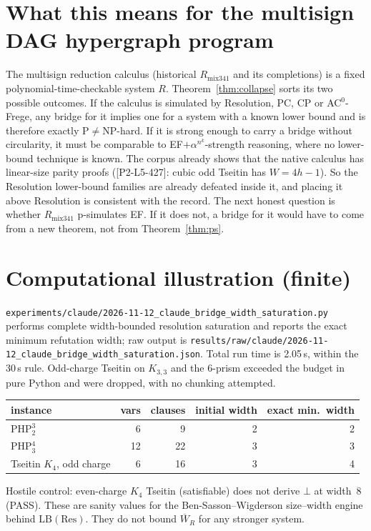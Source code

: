 \documentclass[11pt]{article}
\theoremstyle{definition}
\newcommand{\Wb}{\overline W}
\begin{document}
\section{What this means for the multisign DAG hypergraph program}
The multisign reduction calculus (historical $R_{\mathrm{mix341}}$ and its completions) is a fixed polynomial-time-checkable system $R$. Theorem~\ref{thm:collapse} sorts its two possible outcomes. If the calculus is simulated by Resolution, PC, CP or AC$^0$-Frege, any bridge for it implies one for a system with a known lower bound and is therefore exactly P$\ne$NP-hard. If it is strong enough to carry a bridge without circularity, it must be comparable to EF$+\alpha^{n^k}$-strength reasoning, where no lower-bound technique is known. The corpus already shows that the native calculus has linear-size parity proofs ([P2-L5-427]: cubic odd Tseitin has $W=4h-1$). So the Resolution lower-bound families are already defeated inside it, and placing it above Resolution is consistent with the record. The next honest question is whether $R_{\mathrm{mix341}}$ p-simulates EF. If it does not, a bridge for it would have to come from a new theorem, not from Theorem~\ref{thm:ps}.

\section{Computational illustration (finite)}
\texttt{experiments/claude/2026-11-12\_claude\_bridge\_width\_saturation.py} performs complete width-bounded resolution saturation and reports the exact minimum refutation width; raw output is \texttt{results/raw/claude/2026-11-12\_claude\_bridge\_width\_saturation.json}. Total run time is 2.05\,s, within the 30\,s rule. Odd-charge Tseitin on $K_{3,3}$ and the 6-prism exceeded the budget in pure Python and were dropped, with no chunking attempted.

\begin{center}
\begin{tabular}{lrrrr}
instance & vars & clauses & initial width & exact min.\ width\\\hline
PHP$^3_2$ & 6 & 9 & 2 & 2\\
PHP$^4_3$ & 12 & 22 & 3 & 3\\
Tseitin $K_4$, odd charge & 6 & 16 & 3 & 4\\
\end{tabular}
\end{center}
Hostile control: even-charge $K_4$ Tseitin (satisfiable) does not derive $\bot$ at width~8 (PASS). These are sanity values for the Ben-Sasson--Wigderson size--width engine behind $\mathrm{LB}(\mathrm{Res})$. They do not bound $\Wb_R$ for any stronger system.
\end{document}
